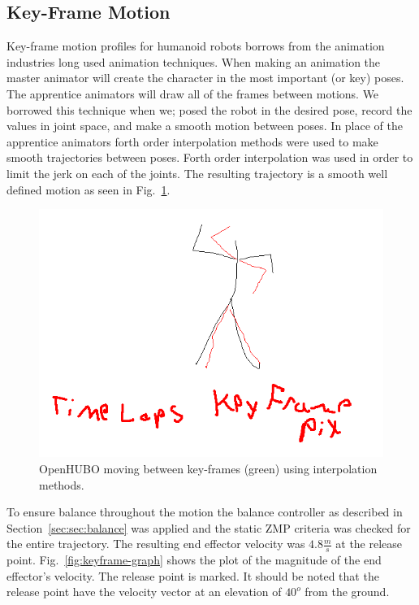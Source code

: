 \subsection{Key-Frame Motion}\label{sec:sec:keyframe}

Key-frame motion profiles for humanoid robots borrows from the animation industries long used animation techniques.  
When making an animation the master animator will create the character in the most important (or key) poses.  
The apprentice animators will draw all of the frames between motions.  
We borrowed this technique when we; posed the robot in the desired pose, record the values in joint space, and make a smooth motion between poses.  
In place of the apprentice animators forth order interpolation methods were used to make smooth trajectories between poses.  
Forth order interpolation was used in order to limit the jerk on each of the joints.  
The resulting trajectory is a smooth well defined motion as seen in Fig.~\ref{fig:keyframe-throw}.

\begin{figure}[t]
  \centering
\includegraphics[width=1.0\columnwidth]{./pix/fakeThrow.png}
  \caption{OpenHUBO moving between key-frames (green) using interpolation methods.}
  \label{fig:keyframe-throw}
\end{figure}

To ensure balance throughout the motion the balance controller as described in Section~\ref{sec:sec:balance} was applied and the static ZMP criteria was checked for the entire trajectory.
The resulting end effector velocity was $4.8\frac{m}{s}$ at the release point.  
Fig.~\ref{fig:keyframe-graph} shows the plot of the magnitude of the end effector's velocity.  
The release point is marked.  
It should be noted that the release point have the velocity vector at an elevation of $40^o$ from the ground.

